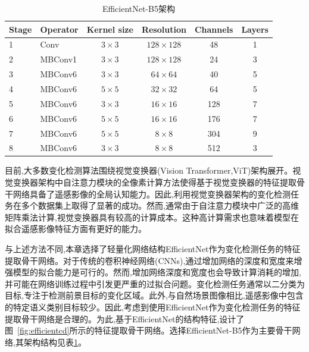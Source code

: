 \begin{table}[!htbp]
\centering
\caption{EfficientNet-B5架构}
\label{tab:efficientnet-b5}
\begin{tabular}{l l c c c c}
\toprule
\textbf{Stage} & \textbf{Operator} & \textbf{Kernel size} & \textbf{Resolution} & \textbf{Channels} & \textbf{Layers} \\
\midrule
1     & Conv       & $3\times3$     & $128\times128$  & 48       & 1      \\
2     & MBConv1    & $3\times3$     & $128\times128$  & 24       & 3      \\
3     & MBConv6    & $3\times3$     & $64\times64$    & 40       & 5      \\
4     & MBConv6    & $5\times5$     & $32\times32$    & 64       & 5      \\
5     & MBConv6    & $3\times3$     & $16\times16$    & 128      & 7      \\
6     & MBConv6    & $5\times5$     & $16\times16$    & 176      & 7      \\
7     & MBConv6    & $5\times5$     & $8\times8$      & 304      & 9      \\
8     & MBConv6    & $3\times3$     & $8\times8$      & 512      & 3      \\
\bottomrule
\end{tabular}
\end{table}


目前,大多数变化检测算法围绕视觉变换器(Vision Transformer,ViT)架构展开。视觉变换器架构中自注意力模块的全像素计算方法使得基于视觉变换器的特征提取骨干网络具备了遥感影像的全局认知能力。因此,利用视觉变换器架构的变化检测任务在多个数据集上取得了显著的成功。然而,通常由于自注意力模块中广泛的高维矩阵乘法计算,视觉变换器具有较高的计算成本。这种高计算需求也意味着模型在拟合遥感影像特征方面有更好的能力。

与上述方法不同,本章选择了轻量化网络结构EfficientNet作为变化检测任务的特征提取骨干网络。对于传统的卷积神经网络(CNNs),通过增加网络的深度和宽度来增强模型的拟合能力是可行的。然而,增加网络深度和宽度也会导致计算消耗的增加,并可能在网络训练过程中引发更严重的过拟合问题。变化检测任务通常以二分类为目标,专注于检测前景目标的变化区域。此外,与自然场景图像相比,遥感影像中包含的特定语义类别目标较少。因此,考虑到使用EfficientNet作为变化检测任务的特征提取骨干网络是合理的。为此,基于EfficientNet的结构特征,设计了图~\ref{fig:efficientcd}所示的特征提取骨干网络。选择EfficientNet-B5作为主要骨干网络,其架构结构见表\ref{tab:efficientnet-b5}。

